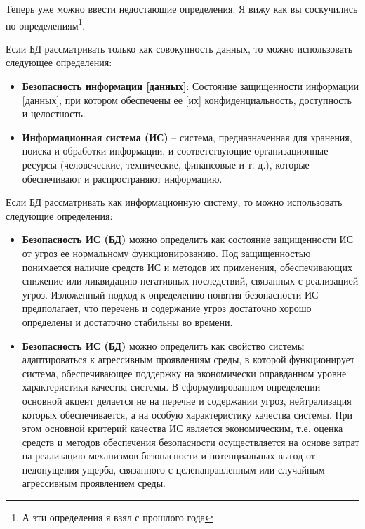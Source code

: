 Теперь уже можно ввести недостающие определения. Я вижу как вы соскучились по определениям\footnote{А эти определения я взял с прошлого года}.
\begin{grayquote}
Если БД рассматривать только как совокупность данных, то можно использовать следующее определения:
\begin{itemize}
	\item \textbf{Безопасность информации [данных]}: Состояние защищенности информации [данных], при котором обеспечены ее [их] конфиденциальность, доступность и целостность.
	\item \textbf{Информационная система (ИС)} -- система, предназначенная для хранения, поиска и обработки информации, и соответствующие организационные ресурсы (человеческие, технические, финансовые и т. д.), которые обеспечивают и распространяют информацию.
\end{itemize}

Если БД рассматривать как информационную систему, то можно использовать следующие определения:
\begin{itemize}
	\item \textbf{Безопасность ИС (БД)} можно определить как состояние защищенности ИС от угроз ее нормальному функционированию. Под защищенностью понимается наличие средств ИС и методов их применения, обеспечивающих снижение или ликвидацию негативных последствий, связанных с реализацией угроз. Изложенный подход к определению понятия безопасности ИС предполагает, что перечень и содержание угроз достаточно хорошо определены и достаточно стабильны во времени.

	\item \textbf{Безопасность ИС (БД)} можно определить как свойство системы адаптироваться к агрессивным проявлениям среды, в которой функционирует система, обеспечивающее поддержку на экономически оправданном уровне характеристики качества системы. В сформулированном определении основной акцент делается не на перечне и содержании угроз, нейтрализация которых обеспечивается, а на особую характеристику качества системы. При этом основной критерий качества ИС является экономическим, т.е. оценка средств и методов обеспечения безопасности осуществляется на основе затрат на реализацию механизмов безопасности и потенциальных выгод от недопущения ущерба, связанного с целенаправленным или случайным агрессивным проявлением среды.
\end{itemize}
\end{grayquote}


